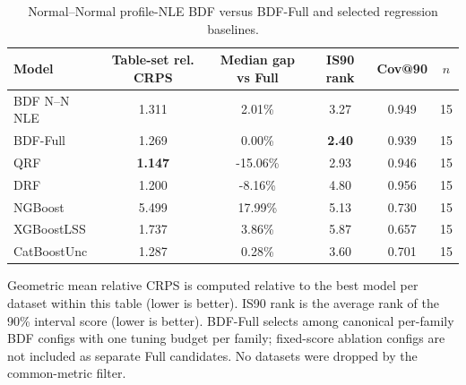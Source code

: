 \begin{table}[htbp]
\centering
\caption{Normal--Normal profile-NLE BDF versus BDF-Full and selected regression baselines.}
\label{tab:bdf-normal-nle-vs-full}
\begin{tabular}{lccccc}
\toprule
Model & Table-set rel. CRPS & Median gap vs Full & IS90 rank & Cov@90 & $n$ \\
\midrule
BDF N--N NLE & 1.311 & 2.01\% & 3.27 & 0.949 & 15 \\
BDF-Full & 1.269 & 0.00\% & \textbf{2.40} & 0.939 & 15 \\
QRF & \textbf{1.147} & -15.06\% & 2.93 & 0.946 & 15 \\
DRF & 1.200 & -8.16\% & 4.80 & 0.956 & 15 \\
NGBoost & 5.499 & 17.99\% & 5.13 & 0.730 & 15 \\
XGBoostLSS & 1.737 & 3.86\% & 5.87 & 0.657 & 15 \\
CatBoostUnc & 1.287 & 0.28\% & 3.60 & 0.701 & 15 \\
\bottomrule
\end{tabular}
\par\smallskip\footnotesize{Geometric mean relative CRPS is computed relative to the best model per dataset within this table (lower is better). IS90 rank is the average rank of the 90\% interval score (lower is better). BDF-Full selects among canonical per-family BDF configs with one tuning budget per family; fixed-score ablation configs are not included as separate Full candidates. No datasets were dropped by the common-metric filter.}
\end{table}
